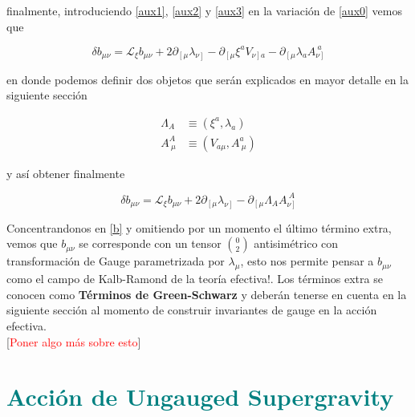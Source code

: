 \documentclass{article}
\numberwithin{equation}{section}
\begin{document}
finalmente, introduciendo \ref{aux1}, \ref{aux2} y \ref{aux3} en la variación de \ref{aux0} vemos que

\begin{equation*}
\delta b_{\mu \nu} = \mathcal{L}_{\xi} b_{\mu \nu}+ 2 \partial_{\left[\mu \right.} \lambda_{\left. \nu \right]} - \partial_{\left[\mu \right.} \xi^a V_{\left. \nu \right] a} - \partial_{\left[\mu \right.} \lambda_a A_{\left. \nu \right]}^{\ a} 
\end{equation*}

en donde podemos definir dos objetos que serán explicados en mayor detalle en la siguiente sección

\begin{equation}\label{ADFT}
\begin{aligned}
\Lambda_A &\equiv \left( \xi^a, \lambda_a \right)\\
A_{\ \mu}^{A} &\equiv \left( V_{a \mu}, A_{\ \mu}^{ a} \right)
\end{aligned}
\end{equation}

y así obtener finalmente\\

\begin{boxquation}
	\begin{equation}\label{b}
	\delta b_{\mu \nu} = \mathcal{L}_{\xi} b_{\mu \nu} + 2 \partial_{\left[\mu \right.} \lambda_{\left. \nu \right]} - \partial_{\left[\mu \right.} \Lambda_A A^{\ A}_{\left. \nu \right]}
	\end{equation}
\end{boxquation}



Concentrandonos en \ref{b} y omitiendo por un momento el último término extra, vemos que $ b_{\mu \nu} $ se corresponde con un tensor $ \binom{0}{2} $ antisimétrico con transformación de Gauge parametrizada por $ \lambda_{\mu} $, esto nos permite pensar a $ b_{\mu \nu} $ como el campo de Kalb-Ramond de la teoría efectiva!. Los términos extra se conocen como \textbf{Términos de Green-Schwarz} y deberán tenerse en cuenta en la siguiente sección al momento de construir invariantes de gauge en la acción efectiva.\\

[\textcolor{red}{Poner algo más sobre esto}]


\section{\textcolor{teal}{Acción de Ungauged Supergravity}}
\end{document}
